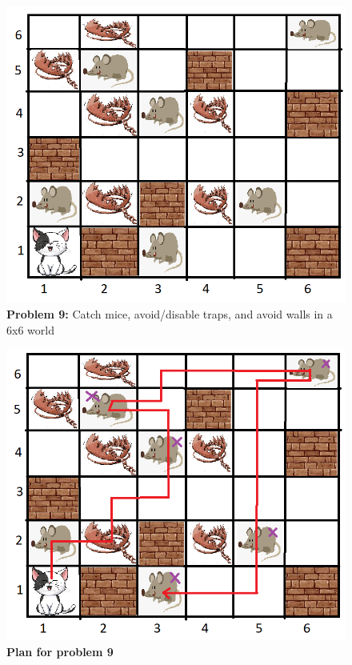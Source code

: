 \begin{multicols}{2}

\begin{figure}[H]
    \centering
    \includegraphics[width=\linewidth]{fig/A3/cat_09.png}
    \caption{\textbf{Problem 9:} Catch mice, avoid/disable traps, and avoid walls in a 6x6 world}
    \label{fig:cat_09}
\end{figure}

\columnbreak

\begin{figure}[H]
    \centering
    \includegraphics[width=\linewidth]{fig/A3/cat_09_sol.png}
    \caption{\textbf{Plan for problem 9}}
    \label{fig:cat_09_sol}
\end{figure}

\end{multicols}

